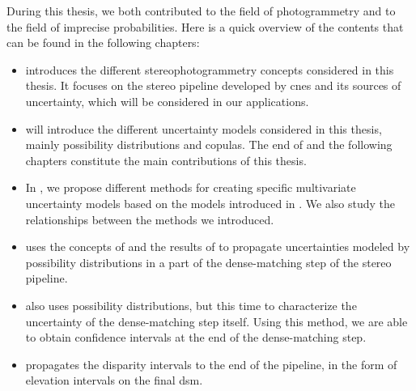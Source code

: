 During this thesis, we both contributed to the field of photogrammetry and to the field of imprecise probabilities. Here is a quick overview of the contents that can be found in the following chapters:
\begin{itemize}
    \item {} introduces the different stereophotogrammetry concepts considered in this thesis. It focuses on the stereo pipeline developed by \acrshort{cnes} and its sources of uncertainty, which will be considered in our applications.
    \item {} will introduce the different uncertainty models considered in this thesis, mainly possibility distributions and copulas. The end of  and the following chapters constitute the main contributions of this thesis.
    \item In , we propose different methods for creating specific multivariate uncertainty models based on the models introduced in . We also study the relationships between the methods we introduced.
    \item {} uses the concepts of  and the results of  to propagate uncertainties modeled by possibility distributions in a part of the dense-matching step of the stereo pipeline.
    \item {} also uses possibility distributions, but this time to characterize the uncertainty of the dense-matching step itself. Using this method, we are able to obtain confidence intervals at the end of the dense-matching step. 
    \item {} propagates the disparity intervals to the end of the pipeline, in the form of elevation intervals on the final \acrshort{dsm}. 
\end{itemize}

